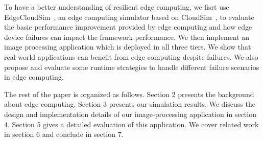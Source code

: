 To have a better understanding of resilient edge computing, we fisrt use EdgeCloudSim~\cite{edgecloudsim},
an edge computing simulator based on CloudSim~\cite{cloudsim},
to evaluate the basic performance improvement provided by edge computing and how edge device failures can impact
the framework performance. We then implement an image processing application which is
deployed in all three tiers. We show that real-world applications can benefit from edge computing
despite failures. We also propose and evaluate some runtime strategies to handle different
failure scenarios in edge computing.

The rest of the paper is organized as follows. Section 2 presents the background about
edge computing. Section 3 presents our simulation results. We discuss the design
and implementation details of our image-processing application in section 4. Section 5 gives a detailed
evaluation of this application. We cover related work in section 6 and conclude in section 7.
